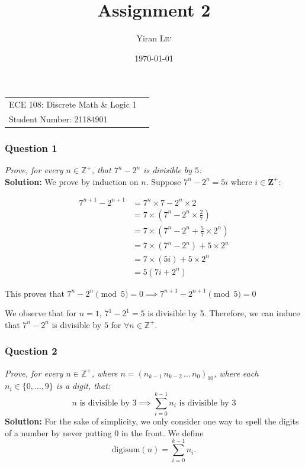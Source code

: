 \documentclass[
	letterpaper, %
	11pt, %
]{CSUniSchoolLabReport}
\title{Assignment 2} %
\author{Yiran \textsc{Liu}} %
\date{\today} %
\begin{document}
\maketitle %

\begin{center}
	\begin{tabular}{l r}
      ECE 108: Discrete Math \& Logic 1 \\
      Student Number: 21184901
	\end{tabular}
\end{center}

\subsubsection*{Question 1}
\textit{Prove, for every $n\in\mathbb{Z}^+$, that $7^n - 2^n$ is divisible by $5$:} \\

\textbf{Solution:} We prove by induction on $n$. Suppose $7^n - 2^n = 5i$ where $i \in \mathbf{Z^+}$:

\begin{align*}
	7^{n+1} - 2^{n+1} & = 7^n \times 7 - 2^n \times 2 \\
	& = 7 \times (7^n - 2^n \times \frac{2}{7}) \\
	& = 7 \times (7^n - 2^n + \frac{5}{7} \times 2^n) \\
	& = 7 \times (7^n - 2^n) + 5 \times 2^n \\
	& = 7 \times (5i) + 5 \times 2^n \\
	& = 5 (7i + 2^n)
\end{align*}

This proves that $7^n - 2^n \pmod{5} = 0 \implies 7^{n+1} - 2^{n+1} \pmod{5} = 0$

We observe that for $n=1$, $7^1 - 2^1 = 5$ is divisible by 5. Therefore, we can induce that $7^n - 2^n$ is divisible by $5$ for $\forall n\in\mathbb{Z}^+$.

\pagebreak

\subsubsection*{Question 2}
\textit{Prove, for every $n\in\mathbb{Z}^+$, where $n = \left(n_{k-1}\,n_{k-2}\,\ldots\,n_0\right)_{10}$, where each $n_i \in\{0,\ldots, 9\}$ is a digit, that:}
\[
n\text{ is divisible by } 3 \implies \sum_{i=0}^{k-1} n_i \text{ is divisible by } 3
\]
\textbf{Solution:} For the sake of simplicity, we only consider one way to spell the digits of a number by never putting 0 in the front.
We define \[
	\mathrm{digisum}(n) = \sum_{i=0}^{k-1} n_i.
\]
\end{document}
